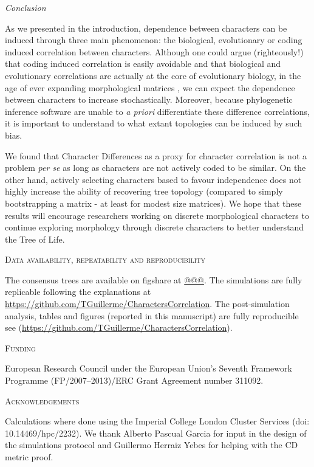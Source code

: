 \documentclass[12pt,letterpaper]{article}
\renewcommand{\section}[1]{%
\bigskip
\begin{center}
\begin{Large}
\normalfont\scshape #1
\medskip
\end{Large}
\end{center}}
\renewcommand{\subsection}[1]{%
\bigskip
\begin{center}
\begin{large}
\normalfont\itshape #1
\end{large}
\end{center}}
\begin{document}
\subsection{Conclusion}
As we presented in the introduction, dependence between characters can be induced through three main phenomenon: the biological, evolutionary or coding induced correlation between characters.
Although one could argue (righteously!) that coding induced correlation is easily avoidable and that biological and evolutionary correlations are actually at the core of evolutionary biology, in the age of ever expanding morphological matrices \citep[e.g.][with more than 1000 characters each]{nithe2013,O'Leary08022013}, we can expect the dependence between characters to increase stochastically.
Moreover, because phylogenetic inference software are unable to \textit{a priori} differentiate these difference correlations, it is important to understand to what extant topologies can be induced by such bias.

We found that Character Differences as a proxy for character correlation is not a problem \textit{per se} as long as characters are not actively coded to be similar.
On the other hand, actively selecting characters based to favour independence does not highly increase the ability of recovering tree topology (compared to simply bootstrapping a matrix - at least for modest size matrices).
We hope that these results will encourage researchers working on discrete morphological characters to continue exploring morphology through discrete characters to better understand the Tree of Life.

\section{Data availability, repeatability and reproducibility}
The consensus trees are available on figshare at \url{@@@}.
The simulations are fully replicable following the explanations at \url{https://github.com/TGuillerme/CharactersCorrelation}.
The post-simulation analysis, tables and figures (reported in this manuscript) are fully reproducible see (\url{https://github.com/TGuillerme/CharactersCorrelation}).

\section{Funding}
European Research Council under the European Union’s Seventh Framework Programme (FP/2007–2013)/ERC Grant Agreement number 311092.

\section{Acknowledgements}
Calculations where done using the Imperial College London Cluster Services (doi: 10.14469/hpc/2232).
We thank Alberto Pascual Garcia for input in the design of the simulations protocol and Guillermo Herraiz Yebes for helping with the CD metric proof.






\end{document}
